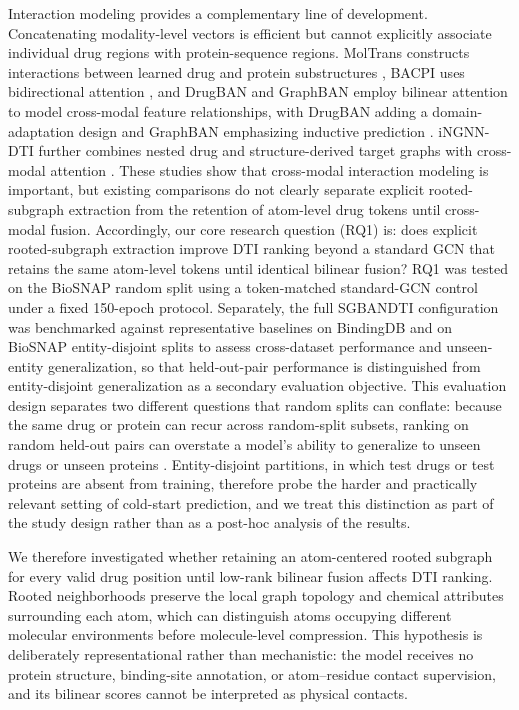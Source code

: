 \documentclass[computers,article,submit,moreauthors]{Definitions/mdpi}
\begin{document}
Interaction modeling provides a complementary line of development. Concatenating modality-level vectors is efficient but cannot explicitly associate individual drug regions with protein-sequence regions. MolTrans constructs interactions between learned drug and protein substructures \citep{huang2021moltrans}, BACPI uses bidirectional attention \citep{li2022bacpi}, and DrugBAN and GraphBAN employ bilinear attention to model cross-modal feature relationships, with DrugBAN adding a domain-adaptation design and GraphBAN emphasizing inductive prediction \citep{bai2023drugban,hadipour2025graphban}. iNGNN-DTI further combines nested drug and structure-derived target graphs with cross-modal attention \citep{sun2024ingnndti}. These studies show that cross-modal interaction modeling is important, but existing comparisons do not clearly separate explicit rooted-subgraph extraction from the retention of atom-level drug tokens until cross-modal fusion. Accordingly, our core research question (RQ1) is: does explicit rooted-subgraph extraction improve DTI ranking beyond a standard GCN that retains the same atom-level tokens until identical bilinear fusion? RQ1 was tested on the BioSNAP random split using a token-matched standard-GCN control under a fixed 150-epoch protocol. Separately, the full SGBANDTI configuration was benchmarked against representative baselines on BindingDB and on BioSNAP entity-disjoint splits to assess cross-dataset performance and unseen-entity generalization, so that held-out-pair performance is distinguished from entity-disjoint generalization as a secondary evaluation objective. This evaluation design separates two different questions that random splits can conflate: because the same drug or protein can recur across random-split subsets, ranking on random held-out pairs can overstate a model's ability to generalize to unseen drugs or unseen proteins \citep{torrisi2022}. Entity-disjoint partitions, in which test drugs or test proteins are absent from training, therefore probe the harder and practically relevant setting of cold-start prediction, and we treat this distinction as part of the study design rather than as a post-hoc analysis of the results.

We therefore investigated whether retaining an atom-centered rooted subgraph for every valid drug position until low-rank bilinear fusion affects DTI ranking. Rooted neighborhoods preserve the local graph topology and chemical attributes surrounding each atom, which can distinguish atoms occupying different molecular environments before molecule-level compression. This hypothesis is deliberately representational rather than mechanistic: the model receives no protein structure, binding-site annotation, or atom--residue contact supervision, and its bilinear scores cannot be interpreted as physical contacts.
\end{document}
